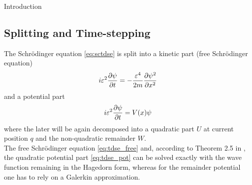 \begin{chapter}{Introduction}
\subsection{Splitting and Time-stepping} %
\label{sub:Splitting and Time-stepping}
The Schrödinger equation \eqref{eq:sctdse} is split into a kinetic part (free Schrödinger equation)
\begin{equation}
    \label{eq:tdse_free}
    i\varepsilon^2\frac{\partial \psi}{\partial t}=-\frac{\varepsilon^4}{2m}\frac{\partial \psi^2}{\partial x^2}
\end{equation}
and a potential part
\begin{equation}
    \label{eq:tdse_pot}
    i\varepsilon^2\frac{\partial \psi}{\partial t}=V(x)\psi
\end{equation}
where the later will be again decomposed into a quadratic part $U$ at current position $q$ and the non-quadratic remainder $W$.\\
The free Schrödinger equation \eqref{eq:tdse_free} and, according to Theorem 2.5 in \cite{H_ladder_operators}, the quadratic potential part
\eqref{eq:tdse_pot} can be solved exactly with the wave function remaining in the Hagedorn form, whereas for the remainder potential one has to
rely on a Galerkin approximation.





\end{chapter}
